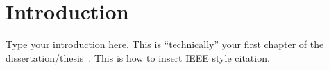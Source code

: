 \chapter{Introduction}

Type your introduction here.  This is ``technically'' your first chapter of the dissertation/thesis~\cite{yan2019resistive}.
This is how to insert IEEE style citation.